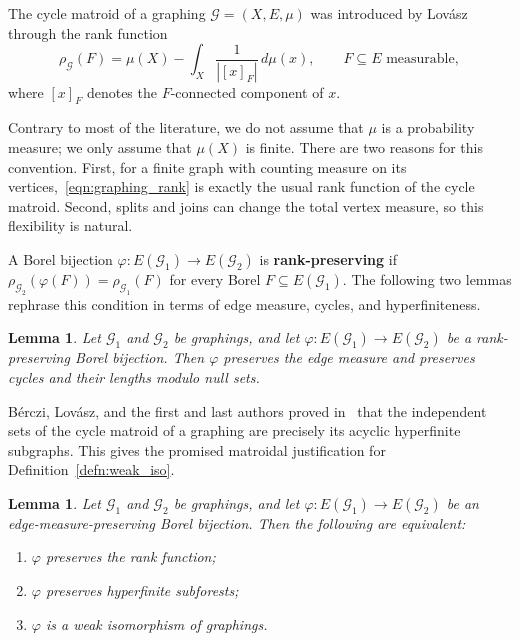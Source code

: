 \documentclass{article}
\theoremstyle{plain}
\newtheorem{lem}[thm]{Lemma}
\theoremstyle{definition}
\newcommand{\cG}{\mathcal{G}}
\newcommand{\fg}{\varphi}
\begin{document}
The cycle matroid of a graphing $\cG=(X,E,\mu)$ was introduced by Lov\'asz~\cite{lovasz2024matroid} through the rank function
\begin{equation}\label{eqn:graphing_rank}
    \rho_{\mathcal{G}}(F)=\mu(X)-\int_X\frac{1}{|[x]_F|}\,d\mu(x),
    \qquad F\subseteq E\text{ measurable},
\end{equation}
where $[x]_F$ denotes the $F$-connected component of $x$.

Contrary to most of the literature, we do not assume that $\mu$ is a probability measure; we only assume that $\mu(X)$ is finite. There are two reasons for this convention. First, for a finite graph with counting measure on its vertices,~\eqref{eqn:graphing_rank} is exactly the usual rank function of the cycle matroid. Second, splits and joins can change the total vertex measure, so this flexibility is natural.

A Borel bijection $\varphi:E(\cG_1)\to E(\cG_2)$ is \textbf{rank-preserving} if $\rho_{\cG_2}(\varphi(F))=\rho_{\cG_1}(F)$ for every Borel $F\subseteq E(\cG_1)$. The following two lemmas rephrase this condition in terms of edge measure, cycles, and hyperfiniteness.

\begin{lem}\label{lem:cylce_preserv}
    Let $\cG_1$ and $\cG_2$ be graphings, and let $\varphi:E(\cG_1)\to E(\cG_2)$ be a rank-preserving Borel bijection. Then $\varphi$ preserves the edge measure and preserves cycles and their lengths modulo null sets.
\end{lem}

B\'erczi, Lov\'asz, and the first and last authors proved in~\cite{berczi2026cycle} that the independent sets of the cycle matroid of a graphing are precisely its acyclic hyperfinite subgraphs. This gives the promised matroidal justification for Definition~\ref{defn:weak_iso}.

\begin{lem}\label{lem:eq_of_rankpres}
    Let $\cG_1$ and $\cG_2$ be graphings, and let $\varphi:E(\cG_1)\to E(\cG_2)$ be an edge-measure-preserving Borel bijection. Then the following are equivalent:
    \begin{enumerate}
        \item $\fg$ preserves the rank function;\label{lemma:eq_of_rankpres_rank}
        \item $\fg$ preserves hyperfinite subforests;\label{lemma:eq_of_rankpres_subforest}
        \item $\fg$ is a weak isomorphism of graphings.\label{lemma:eq_of_rankpres_cyclehf}
    \end{enumerate}
\end{lem}
\end{document}
